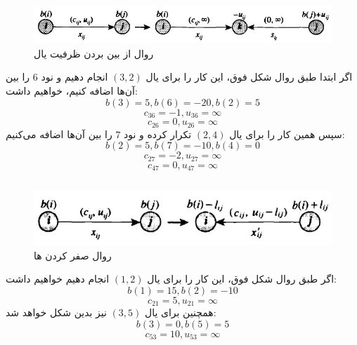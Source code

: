 \documentclass{article}
\begin{document}
\begin{multicols}{2}
\subsection*{}
\begin{figure}[H]
    \center
    \includegraphics[width=\linewidth]{Photos/HW2/remove_c.png}
    \caption{
    روال از بین بردن ظرفیت یال
    }
    \label{fig:my_label}
\end{figure}
اگر ابتدا طبق روال شکل فوق، این کار را برای یال
$(3, 2)$
انجام دهیم و نود
$6$
را بین آن‌ها اضافه کنیم، خواهیم داشت:
$$b(3) = 5, b(6) = -20, b(2) = 5$$
$$c_{36} = -1, u_{36} = \infty$$
$$c_{26} = 0, u_{26} = \infty$$
سپس همین کار را برای یال
$(2, 4)$
تکرار کرده و نود
$7$
را بین آن‌ها اضافه می‌کنیم:
$$b(2) = 5, b(7) = -10, b(4) = 0$$
$$c_{27} = -2, u_{27} = \infty$$
$$c_{47} = 0, u_{47} = \infty$$

\subsection*{}
\begin{figure}[H]
    \center
    \includegraphics[width=0.9\linewidth]{Photos/HW2/nonzero_lb.png}
    \caption{
    روال صفر کردن
    ها
    }
    \label{fig:my_label}
\end{figure}
اگر طبق روال شکل فوق، این کار را برای یال
$(1, 2)$
انجام دهیم خواهیم داشت:
$$b(1) = 15, b(2) = -10$$
$$c_{21} = 5, u_{21} = \infty$$
همچنین برای یال
$(3, 5)$
نیز بدین شکل خواهد شد:
$$b(3) = 0, b(5) = 5$$
$$c_{53} = 10, u_{53} = \infty$$


\end{multicols}
\end{document}
